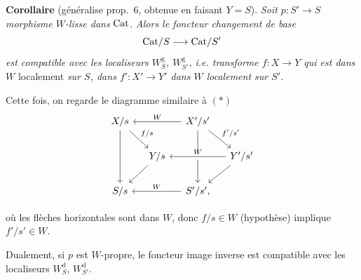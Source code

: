 \textbf{Corollaire} (généralise prop.~6, obtenue en faisant $Y=S$). \textit{Soit $p : S'\longrightarrow S$} \textit{morphisme $W$-lisse dans} $\mathrm{Cat}$. \textit{Alors le foncteur changement de base}
\[
\mathrm{Cat}/S\longrightarrow\mathrm{Cat}/S'
\]
\textit{est compatible avec les localiseurs $W^{\mathrm{g}}_S$, $W^{\mathrm{g}}_{S'}$, i.e. transforme $f : X\longrightarrow Y$ qui est dans $W$} localement \textit{sur $S$, dans $f' : X'\longrightarrow Y'$ dans $W$ localement sur $S'$.}

Cette fois, on regarde le diagramme similaire à $(*)$
\[
\begin{tikzcd}[column sep=small]
X/s \arrow[dd] \arrow[dr, "f/s"] & & X'/s' \arrow[ll, "W"'] \arrow[dd] \arrow[dr, "f'/s'"] & \\
& Y/s \arrow[dl] & & Y'/s' \arrow[ll, "W"', crossing over] \arrow[dl] \\
S/s & & S'/s', \arrow[ll, "W"'] &
\end{tikzcd}
\]

où les flèches horizontales sont dans $W$, donc $f/s\in W$ (hypothèse) implique $f'/s'\in W$.

\leavevmode{}Dualement, si $p$ est $W$-propre, le foncteur image inverse est compatible avec les localiseurs $W^{\mathrm{d}}_S$, $W^{\mathrm{d}}_{S'}$.

